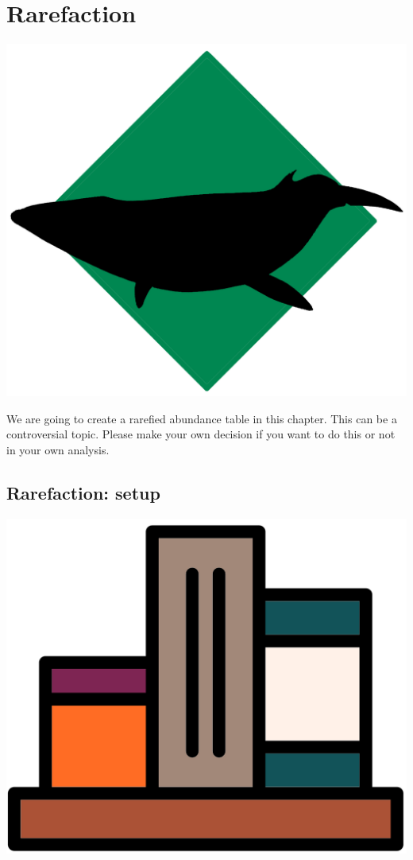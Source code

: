 \documentclass[
]{book}
\begin{document}
\hypertarget{rarefaction_chap}{%
\chapter{Rarefaction}\label{rarefaction_chap}}

\includegraphics{figures/whale.png}

We are going to create a rarefied abundance table in this chapter.
This can be a controversial topic.
Please make your own decision if you want to do this or not in your own analysis.

\hypertarget{rarefaction-setup}{%
\section{Rarefaction: setup}\label{rarefaction-setup}}

\includegraphics{figures/library_1.png}
\end{document}
